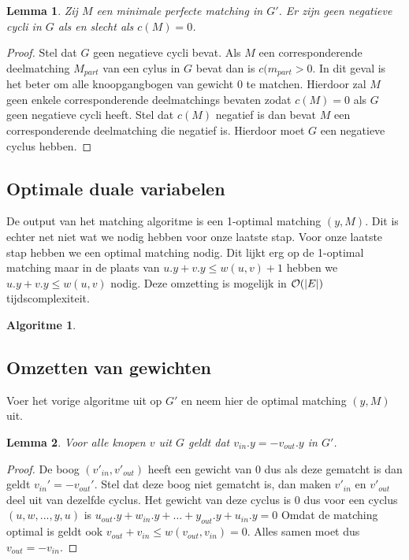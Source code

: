 \documentclass[conference]{IEEEtran}
\newtheorem{lemma}{Lemma}[section]
\theoremstyle{definition}
\newtheorem{algorithmm}{Algoritme}[section]
\theoremstyle{remark}
\DeclarePairedDelimiter{\card}{\vert}{\vert}  %
\begin{document}
\begin{lemma}
    Zij $M$ een minimale perfecte matching in $G'$. Er zijn geen negatieve cycli in $G$ als en slecht als $c(M) = 0$.
\end{lemma}
\begin{proof}
    Stel dat $G$ geen negatieve cycli bevat. Als $M$ een corresponderende deelmatching $M_{part}$ van een cylus in $G$ bevat dan is $c(m_{part} > 0$. In dit geval is het beter om alle knoopgangbogen van gewicht $0$ te matchen. Hierdoor zal $M$ geen enkele corresponderende deelmatchings bevaten zodat $c(M) = 0$ als $G$ geen negatieve cycli heeft.
    Stel dat $c(M)$ negatief is dan bevat $M$ een corresponderende deelmatching die negatief is. Hierdoor moet $G$ een negatieve cyclus hebben.
\end{proof}

\subsection{Optimale duale variabelen}
De output van het matching algoritme is een 1-optimal matching $(y,M)$. Dit is echter net niet wat we nodig hebben voor onze laatste stap. Voor onze laatste stap hebben we een optimal matching nodig. Dit lijkt erg op de 1-optimal matching maar in de plaats van $u.y + v.y \leq w(u, v) + 1$ hebben we $u.y + v.y \leq w(u, v)$ nodig. Deze omzetting is mogelijk in $\mathcal{O}(\card{E})$ tijdscomplexiteit.

\begin{algorithmm}
    
\end{algorithmm}

\subsection{Omzetten van gewichten}
Voer het vorige algoritme uit op $G'$ en neem hier de optimal matching $(y, M)$ uit.

\begin{lemma}
    Voor alle knopen $v$ uit $G$ geldt dat $v_{in}.y = -v_{out}.y$ in $G'$.
\end{lemma}
\begin{proof}
    De boog $(v'_{in}, v'_{out})$ heeft een gewicht van $0$ dus als deze gematcht is dan geldt $v_{in}' = -v_{out}'$. Stel dat deze boog niet gematcht is, dan maken $v'_{in}$ en $v'_{out}$ deel uit van dezelfde cyclus. Het gewicht van deze cyclus is $0$ dus voor een cyclus $(u, w, ..., y, u)$ is $u_{out}.y + w_{in}.y + \dots + y_{out}.y + u_{in}.y = 0$ Omdat de matching optimal is geldt ook $v_{out} + v_{in} \leq w(v_{out}, v_{in}) = 0$. Alles samen moet dus $v_{out} = -v_{in}$.
\end{proof}
\end{document}
